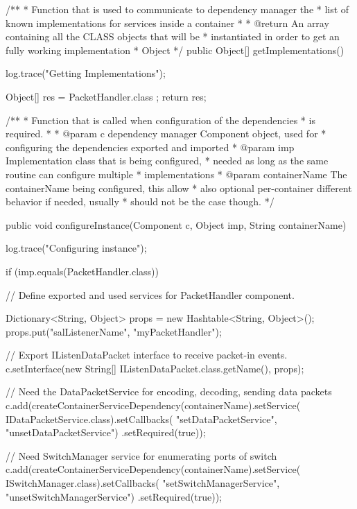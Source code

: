 \documentclass[a4paper,11pt]{book}
\begin{document}
\begin{java}
{{    }


    /**
     * Function that is used to communicate to dependency manager the
     * list of known implementations for services inside a container
     *
     * @return An array containing all the CLASS objects that will be
     * instantiated in order to get an fully working implementation
     * Object
     */
    public Object[] getImplementations() {
        log.trace("Getting Implementations");

        Object[] res = { PacketHandler.class };
        return res;
    }

    /**
     * Function that is called when configuration of the dependencies
     * is required.
     *
     * @param c dependency manager Component object, used for
     * configuring the dependencies exported and imported
     * @param imp Implementation class that is being configured,
     * needed as long as the same routine can configure multiple
     * implementations
     * @param containerName The containerName being configured, this allow
     * also optional per-container different behavior if needed, usually
     * should not be the case though.
     */

    public void configureInstance(Component c, Object imp, String containerName) {
        log.trace("Configuring instance");

        if (imp.equals(PacketHandler.class)) {
            // Define exported and used services for PacketHandler component.

            Dictionary<String, Object> props = new Hashtable<String, Object>();
            props.put("salListenerName", "myPacketHandler");

            // Export IListenDataPacket interface to receive packet-in events.
            c.setInterface(new String[] {IListenDataPacket.class.getName()}, props);

            // Need the DataPacketService for encoding, decoding, sending data packets
            c.add(createContainerServiceDependency(containerName).setService(
                    IDataPacketService.class).setCallbacks(
                    "setDataPacketService", "unsetDataPacketService")
                    .setRequired(true));

            // Need SwitchManager service for enumerating ports of switch
            c.add(createContainerServiceDependency(containerName).setService(
                    ISwitchManager.class).setCallbacks(
                    "setSwitchManagerService", "unsetSwitchManagerService")
                    .setRequired(true));

}}}
\end{java}
\end{document}
